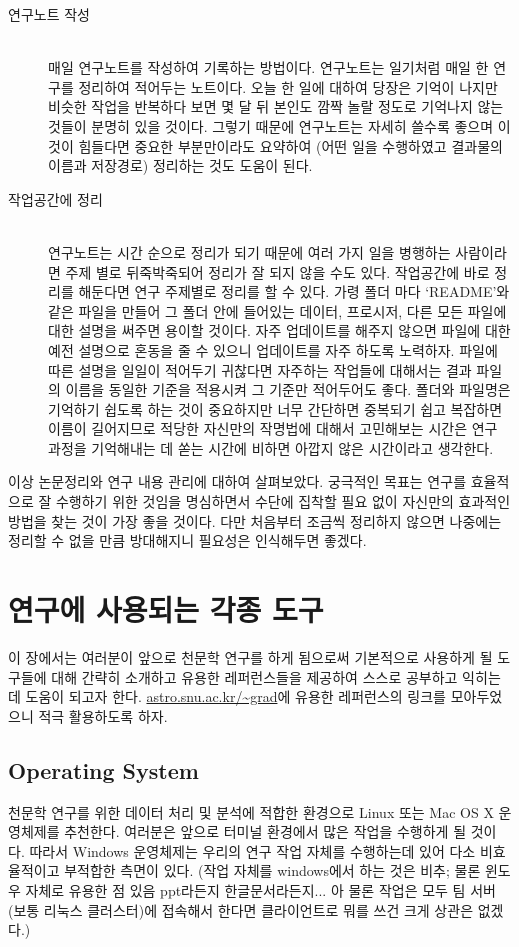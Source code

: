 \begin{description}
\item[연구노트 작성] \hfill \\
  매일 연구노트를 작성하여 기록하는 방법이다. 연구노트는 일기처럼 매일 한 연구를
  정리하여 적어두는 노트이다. 오늘 한 일에 대하여 당장은 기억이 나지만 비슷한
  작업을 반복하다 보면 몇 달 뒤 본인도 깜짝 놀랄 정도로 기억나지 않는 것들이
  분명히 있을 것이다. 그렇기 때문에 연구노트는 자세히 쓸수록 좋으며 이것이
  힘들다면 중요한 부분만이라도 요약하여 (어떤 일을 수행하였고 결과물의 이름과
  저장경로) 정리하는 것도 도움이 된다.
\item[작업공간에 정리] \hfill \\
  연구노트는 시간 순으로 정리가 되기 때문에 여러 가지 일을 병행하는 사람이라면
  주제 별로 뒤죽박죽되어 정리가 잘 되지 않을 수도 있다. 작업공간에 바로 정리를
  해둔다면 연구 주제별로 정리를 할 수 있다. 가령 폴더 마다 ‘README'와 같은 파일을
  만들어 그 폴더 안에 들어있는 데이터, 프로시저, 다른 모든 파일에 대한 설명을
  써주면 용이할 것이다. 자주 업데이트를 해주지 않으면 파일에 대한 예전 설명으로
  혼동을 줄 수 있으니 업데이트를 자주 하도록 노력하자. 파일에 따른 설명을 일일이
  적어두기 귀찮다면 자주하는 작업들에 대해서는 결과 파일의 이름을 동일한 기준을
  적용시켜 그 기준만 적어두어도 좋다. 폴더와 파일명은 기억하기 쉽도록 하는 것이
  중요하지만 너무 간단하면 중복되기 쉽고 복잡하면 이름이 길어지므로 적당한
  자신만의 작명법에 대해서 고민해보는 시간은 연구 과정을 기억해내는 데 쏟는
  시간에 비하면 아깝지 않은 시간이라고 생각한다.
\end{description}

이상 논문정리와 연구 내용 관리에 대하여 살펴보았다. 궁극적인 목표는 연구를
효율적으로 잘 수행하기 위한 것임을 명심하면서 수단에 집착할 필요 없이 자신만의
효과적인 방법을 찾는 것이 가장 좋을 것이다. 다만 처음부터 조금씩 정리하지 않으면
나중에는 정리할 수 없을 만큼 방대해지니 필요성은 인식해두면 좋겠다.

\section{연구에 사용되는 각종 도구}
이 장에서는 여러분이 앞으로 천문학 연구를 하게 됨으로써 기본적으로 사용하게 될
도구들에 대해 간략히 소개하고 유용한 레퍼런스들을 제공하여 스스로 공부하고
익히는데 도움이 되고자 한다. \url{astro.snu.ac.kr/~grad}에 유용한 레퍼런스의
링크를 모아두었으니 적극 활용하도록 하자.

\subsection{Operating System}
천문학 연구를 위한 데이터 처리 및 분석에 적합한 환경으로 Linux 또는 Mac OS X
운영체제를 추천한다. 여러분은 앞으로 터미널 환경에서 많은 작업을 수행하게 될
것이다. 따라서 Windows 운영체제는 우리의 연구 작업 자체를 수행하는데 있어 다소
비효율적이고 부적합한 측면이 있다. (작업 자체를 windows에서 하는 것은 비추; 물론
윈도우 자체로 유용한 점 있음 ppt라든지 한글문서라든지... 아 물론 작업은 모두 팀
서버(보통 리눅스 클러스터)에 접속해서 한다면 클라이언트로 뭐를 쓰건 크게 상관은
없겠다.)


